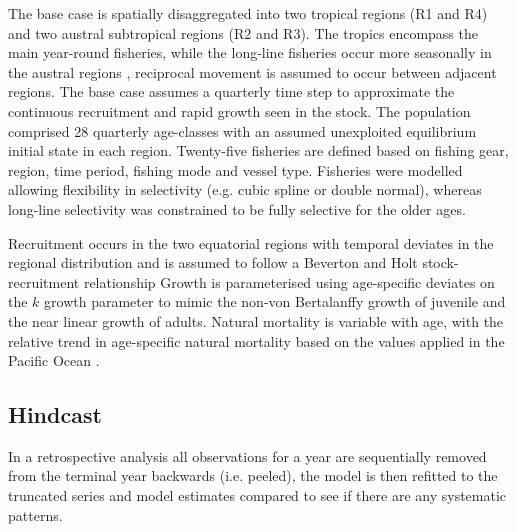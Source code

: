 \documentclass[12pt,halfline,a4paper,nonumbib]{ouparticle}
\begin{document}
The base case is spatially disaggregated into two tropical regions (R1 and R4) and two austral subtropical regions (R2 and R3). The tropics encompass the main year-round fisheries, while the long-line fisheries occur more seasonally in the austral regions \parencite{langley2015yft}, reciprocal movement is assumed to occur between adjacent regions. The base case assumes a quarterly time step to approximate the continuous recruitment and rapid growth seen in the stock. The population comprised 28 quarterly age-classes with an assumed unexploited equilibrium initial state in each region. Twenty-five fisheries are defined based on fishing gear, region, time period, fishing mode and vessel type. Fisheries were modelled allowing flexibility in selectivity (e.g. cubic spline or double normal), whereas long-line selectivity was constrained to be fully selective for the older ages. 

Recruitment occurs in the two equatorial regions with temporal deviates in the regional distribution and is assumed to follow a Beverton and Holt stock-recruitment relationship %
Growth is parameterised using age-specific deviates on the $k$ growth parameter to mimic the non-von Bertalanffy growth of juvenile and the near linear growth of adults. Natural mortality is variable with age, with the relative trend in age-specific natural mortality based on the values applied in the Pacific Ocean \parencite{maunder2012review}. 



\subsection{Hindcast}

In a retrospective analysis all observations for a year are sequentially removed from the terminal year backwards (i.e. peeled), the model is then refitted to the truncated series and model estimates compared to see if there are any systematic patterns. 
\end{document}
